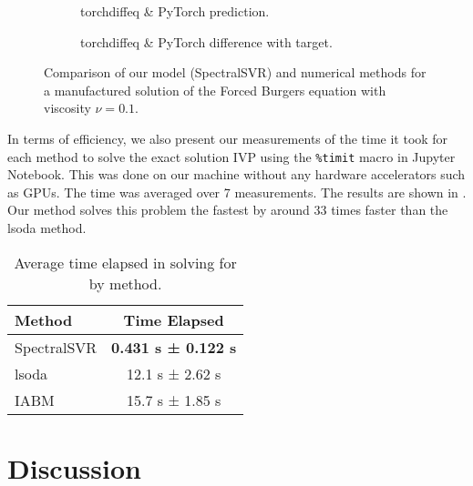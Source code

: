 \begin{figure}[H]
\begin{adjustwidth}{-0.05\linewidth}{-0.05\linewidth}
\begin{subfigure}{0.49\linewidth}
      \begin{adjustbox}{width=\linewidth}
        
      \end{adjustbox}
      \caption{torchdiffeq \& PyTorch prediction.}\label{fig:comp_tdo_pred_0.1}
    \end{subfigure}
    \begin{subfigure}{0.49\linewidth}
      \begin{adjustbox}{width=\linewidth}
        
      \end{adjustbox}
      \caption{torchdiffeq \& PyTorch difference with target.}\label{fig:comp_tdo_diff_0.1}
    \end{subfigure}
  \end{adjustwidth}
  \caption{Comparison of our model (SpectralSVR) and numerical methods for a manufactured solution of the Forced Burgers equation with viscosity \(\nu=0.1\).}\label{fig:comparison_burgers_0.1}
\end{figure}

In terms of efficiency, we also present our measurements of the time it took for each method to solve the exact solution IVP using the \verb|%timit| macro in Jupyter Notebook. This was done on our machine without any hardware accelerators such as GPUs. The time was averaged over 7 measurements. The results are shown in . Our method solves this problem the fastest by around 33 times faster than the lsoda method.
\begin{table}[H]
  \caption{Average time elapsed in solving for  by method.}\label{table:comparison_efficiency}
  \centering
  \begin{tabular}{lc}
    \toprule
    Method      & Time Elapsed               \\
    \midrule
    SpectralSVR & \textbf{0.431 s ± 0.122 s} \\
    lsoda       & 12.1 s ± 2.62 s            \\
    IABM        & 15.7 s ± 1.85 s            \\
    \bottomrule
  \end{tabular}
\end{table}

\section{Discussion}\label{sec:discussion}

